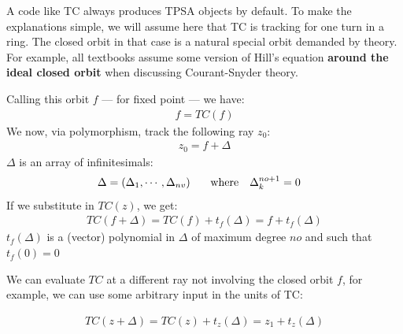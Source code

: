 \documentclass{hitec}     %
\begin{document}
{A code like TC always produces TPSA objects by default. To make the explanations simple, we will assume here  that TC is tracking for one turn in a ring. The closed orbit in that case is a natural special orbit demanded by theory. For example, all textbooks assume some version of Hill's equation {\bf around the  ideal closed orbit} when discussing Courant-Snyder theory.


Calling this orbit $f$ --- for fixed point --- we have: 
%
\begin{align} f=TC(f) \label{eq:fixtc} \end{align}
%
We now, via polymorphism, track the following ray $z_0$:
%
\begin{align} {z}_{0}=
f+\Delta  \label{eq:idtpsa}\end{align}
%
%
$\Delta $ is an array of infinitesimals:
%
\begin{align} \Delta &=\left({{\Delta }_{1},\cdots,{\Delta }_{nv}}\right)~~~~~{\rm w}{\rm h}{\rm e}{\rm r}{\rm e}~~~{\Delta }_{k}^{no+1}=
0 \label{eq:nilpot}\end{align}
%
If we substitute  in $TC(z)$, we get:
%
\begin{align} TC(f+\Delta ) =TC(f)+{t}_{f}(\Delta )=f+{t}_{f}(\Delta ) \label{eq:fixtmap} \end{align}
%
${t}_{f}(\Delta )$ is a (vector) polynomial in $\Delta $ of maximum degree $no$ and such that ${t}_{f}(0)=0$

We can evaluate $TC$ at a different ray not involving the closed orbit $f$, for example, we can use some arbitrary input in the units of TC:

%
\begin{align} TC(z+\Delta ) =TC(z)+{t}_{z}(\Delta )={z}_{1}+{t}_{z}(\Delta ) \label{eq:ztmap} \end{align}


}
\end{document}
